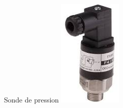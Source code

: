 \begin{UPSTIactivite}
\begin{minipage}[b]{0.24\textwidth}
\end{minipage}
\begin{minipage}[b]{0.24\textwidth}
\centering
  Sonde de pression
  \includegraphics[width=\textwidth,height=.15\textheight,keepaspectratio]{images/sondePression}



\end{minipage}
\end{UPSTIactivite}
